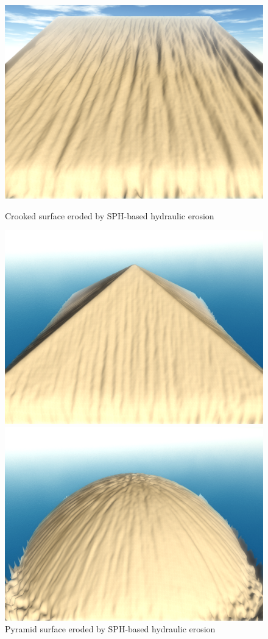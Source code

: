 \documentclass[11pt,a4paper,twoside,openright]{report}
\begin{document}
\begin{figure}[!htb]
  \includegraphics[width=\linewidth]{sph-hydro-10mins-crooked.png}
  \caption{Crooked surface eroded by SPH-based hydraulic erosion}\label{fig:hydro4}
\endminipage\hfill
{}
  \includegraphics[width=\linewidth]{sph-hydro-10mins-pyramid.png}
  \caption{Pyramid surface eroded by SPH-based hydraulic erosion}\label{fig:hydro5}
\endminipage\hfill
{}%
  \includegraphics[width=\linewidth]{sph-hydro-10mins-hemisphere.png}

\end{figure}
\end{document}
